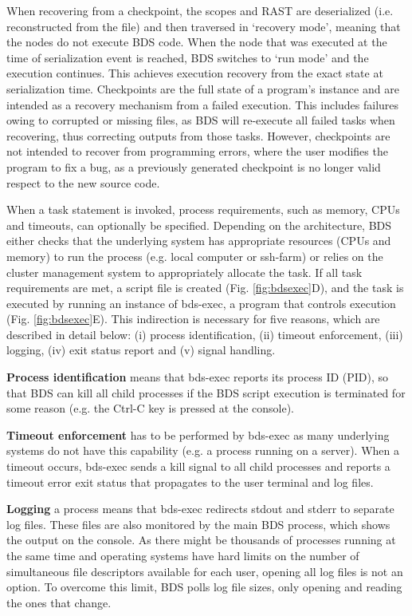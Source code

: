When recovering from a checkpoint, the scopes and RAST are deserialized (i.e. reconstructed from the file) and then traversed in ‘recovery mode’, meaning that the nodes do not execute BDS code. When the node that was executed at the time of serialization event is reached, BDS switches to ‘run mode’ and the execution continues. This achieves execution recovery from the exact state at serialization time. Checkpoints are the full state of a program’s instance and are intended as a recovery mechanism from a failed execution. This includes failures owing to corrupted or missing files, as BDS will re-execute all failed tasks when recovering, thus correcting outputs from those tasks. However, checkpoints are not intended to recover from programming errors, where the user modifies the program to fix a bug, as a previously generated checkpoint is no longer valid respect to the new source code.

When a task statement is invoked, process requirements, such as memory, CPUs and timeouts, can optionally be specified. Depending on the architecture, BDS either checks that the underlying system has appropriate resources (CPUs and memory) to run the process (e.g. local computer or ssh-farm) or relies on the cluster management system to appropriately allocate the task. If all task requirements are met, a script file is created (Fig. \ref{fig:bdsexec}D), and the task is executed by running an instance of bds-exec, a program that controls execution (Fig. \ref{fig:bdsexec}E). This indirection is necessary for five reasons, which are described in detail below: (i) process identification, (ii) timeout enforcement, (iii) logging, (iv) exit status report and (v) signal handling.


\textbf{Process identification} means that bds-exec reports its process ID (PID), so that BDS can kill all child processes if the BDS script execution is terminated for some reason (e.g. the Ctrl-C key is pressed at the console).

\textbf{Timeout enforcement} has to be performed by bds-exec as many underlying systems do not have this capability (e.g. a process running on a server). When a timeout occurs, bds-exec sends a kill signal to all child processes and reports a timeout error exit status that propagates to the user terminal and log files.

\textbf{Logging} a process means that bds-exec redirects stdout and stderr to separate log files. These files are also monitored by the main BDS process, which shows the output on the console. As there might be thousands of processes running at the same time and operating systems have hard limits on the number of simultaneous file descriptors available for each user, opening all log files is not an option. To overcome this limit, BDS polls log file sizes, only opening and reading the ones that change.


